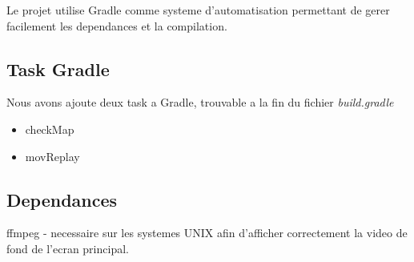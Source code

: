 Le projet utilise Gradle comme systeme d'automatisation permettant de gerer facilement les dependances et la compilation.\\
\subsection{Task Gradle}
Nous avons ajoute deux task a Gradle, trouvable a la fin du fichier \textit{build.gradle}\\
\begin{itemize}
    \item checkMap
    \item movReplay
\end{itemize}
\subsection{Dependances}
ffmpeg - necessaire sur les systemes UNIX afin d'afficher correctement la video de fond de l'ecran principal.